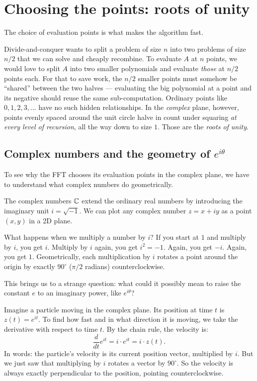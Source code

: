\section{Choosing the points: roots of unity}

The choice of evaluation points is what makes the algorithm fast.

\begin{intuitionbox}
Divide-and-conquer wants to split a problem of size $n$ into two problems of size
$n/2$ that we can solve and cheaply recombine. To evaluate $A$ at $n$ points, we
would love to split $A$ into two smaller polynomials and evaluate \emph{those} at
$n/2$ points each. For that to save work, the $n/2$ smaller points must somehow be
``shared'' between the two halves --- evaluating the big polynomial at a point and
its negative should reuse the same sub-computation. Ordinary points like
$0,1,2,3,\dots$ have no such hidden relationships. In the \emph{complex} plane,
however, points evenly spaced around the unit circle halve in count under squaring
\emph{at every level of recursion}, all the way down to size $1$. Those are the
\emph{roots of unity}.
\end{intuitionbox}

\subsection{Complex numbers and the geometry of $e^{i\theta}$}

To see why the FFT chooses its evaluation points in the complex plane, we have to understand what complex numbers do geometrically. 

The complex numbers $\mathbb{C}$ extend the ordinary real numbers by introducing the imaginary unit $i = \sqrt{-1}$. We can plot any complex number $z = x + iy$ as a point $(x,y)$ in a 2D plane. 

What happens when we multiply a number by $i$? If you start at $1$ and multiply by $i$, you get $i$. Multiply by $i$ again, you get $i^2 = -1$. Again, you get $-i$. Again, you get $1$. Geometrically, each multiplication by $i$ rotates a point around the origin by exactly $90^\circ$ ($\pi/2$ radians) counterclockwise. 

This brings us to a strange question: what could it possibly mean to raise the constant $e$ to an imaginary power, like $e^{i\theta}$?

Imagine a particle moving in the complex plane. Its position at time $t$ is $z(t) = e^{it}$. To find how fast and in what direction it is moving, we take the derivative with respect to time $t$. By the chain rule, the velocity is:
\[
\frac{d}{dt} e^{it} = i \cdot e^{it} = i \cdot z(t).
\]
In words: the particle's velocity is its current position vector, multiplied by $i$. But we just saw that multiplying by $i$ rotates a vector by $90^\circ$. So the velocity is always exactly perpendicular to the position, pointing counterclockwise. 

